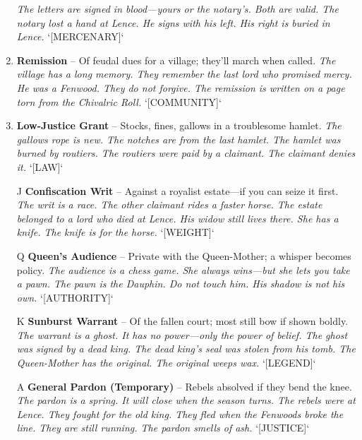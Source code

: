 \begin{enumerate}
  \hfill \textit{The letters are signed in blood---yours or the notary's. Both are valid. The notary lost a hand at Lence. He signs with his left. His right is buried in Lence.} `[MERCENARY]`
\item \textbf{Remission} -- Of feudal dues for a village; they'll march when called.
  \hfill \textit{The village has a long memory. They remember the last lord who promised mercy. He was a Fenwood. They do not forgive. The remission is written on a page torn from the Chivalric Roll.} `[COMMUNITY]`
\item \textbf{Low-Justice Grant} -- Stocks, fines, gallows in a troublesome hamlet.
  \hfill \textit{The gallows rope is new. The notches are from the last hamlet. The hamlet was burned by routiers. The routiers were paid by a claimant. The claimant denies it.} `[LAW]`
\item[J] \textbf{Confiscation Writ} -- Against a royalist estate---if you can seize it first.
  \hfill \textit{The writ is a race. The other claimant rides a faster horse. The estate belonged to a lord who died at Lence. His widow still lives there. She has a knife. The knife is for the horse.} `[WEIGHT]`
\item[Q] \textbf{Queen's Audience} -- Private with the Queen-Mother; a whisper becomes policy.
  \hfill \textit{The audience is a chess game. She always wins---but she lets you take a pawn. The pawn is the Dauphin. Do not touch him. His shadow is not his own.} `[AUTHORITY]`
\item[K] \textbf{Sunburst Warrant} -- Of the fallen court; most still bow if shown boldly.
  \hfill \textit{The warrant is a ghost. It has no power---only the power of belief. The ghost was signed by a dead king. The dead king's seal was stolen from his tomb. The Queen-Mother has the original. The original weeps wax.} `[LEGEND]`
\item[A] \textbf{General Pardon (Temporary)} -- Rebels absolved if they bend the knee.
  \hfill \textit{The pardon is a spring. It will close when the season turns. The rebels were at Lence. They fought for the old king. They fled when the Fenwoods broke the line. They are still running. The pardon smells of ash.} `[JUSTICE]`
\end{enumerate}

